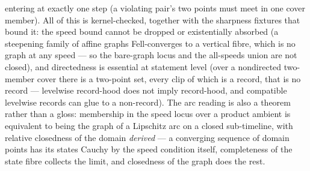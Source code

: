 entering at exactly one step (a violating pair's two points must meet
in one cover member). All of this is kernel-checked, together with
the sharpness fixtures that bound it: the speed bound cannot be
dropped or existentially absorbed (a steepening family of affine
graphs Fell-converges to a vertical fibre, which is no graph at any
speed --- so the bare-graph locus and the all-speeds union are not
closed), and directedness is essential at statement level (over a
nondirected two-member cover there is a two-point set, every clip of
which is a record, that is no record --- levelwise record-hood does
not imply record-hood, and compatible levelwise records can glue to a
non-record). The arc reading is also a theorem rather than a gloss:
membership in the speed locus over a product ambient is equivalent to
being the graph of a Lipschitz arc on a closed sub-timeline, with
relative closedness of the domain \emph{derived} --- a converging
sequence of domain points has its states Cauchy by the speed
condition itself, completeness of the state fibre collects the limit,
and closedness of the graph does the rest.

